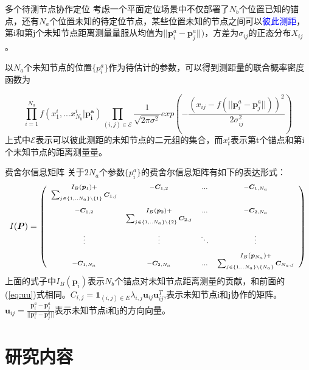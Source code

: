 \documentclass[notheorems,xetex,mathserif,serif]{beamer}
\begin{document}
\begin{frame}{多个待测节点协作定位}
考虑一个平面定位场景中不仅部署了$N_b$个位置已知的锚点，还有$N_a$个位置未知的待定位节点，某些位置未知的节点之间可以\textcolor{blue}{彼此测距}，第i和第j个未知节点距离测量量服从均值为$||\bm{p}^a_i-\bm{p}^a_j||)$，方差为$\sigma_{ij}$的正态分布$X_{ij}$。

以$N_a$个未知节点的位置$\{p_i^a\}$作为待估计的参数，可以得到测距量的联合概率密度函数为

\begin{equation}
\prod_{i=1}^{N_a} f(x^i_1,...x^{i}_{N_b}|\bm{p^a_i})\prod_{(i,j)\in \mathcal{E}}\frac{1}{\sqrt{2\pi\sigma^2}}exp(-\frac{(x_{ij}-f(||\bm{p}^a_i-\bm{p}^a_j||))^2}{2\sigma_{ij}^2})
\end{equation}
上式中$\mathcal{E}$表示可以彼此测距的未知节点的二元组的集合，而$x_t^i$表示第t个锚点和第i个未知节点的距离测量量。
\end{frame}
\begin{frame}{费舍尔信息矩阵}
关于$2N_a$个参数$\{p_i^a\}$的费舍尔信息矩阵有如下的表达形式：
\begin{equation}
\scriptsize{
I(\bm{P})=
\left(
\begin{array}{cccc}
I_B(\bm{p}_1)+&-\bm{C}_{1,2}&...&-\bm{C}_{1,N_a}\\
\sum_{j\in \{1,..N_a\}\backslash\{1\}}\bm{C}_{1,j}&&&\\
&&&\\
-\bm{C}_{1,2} & I_B(\bm{p}_2)+
&...&-\bm{C}_{2,N_a}\\
&\sum_{j\in \{1,..N_a\}\backslash \{2\}}\bm{C}_{2,j}&&\\
&&&\\
\vdots &\vdots&\ddots &\vdots\\
&&&\\
&&&I_B(\bm{p}_{N_a})+\\
-\bm{C}_{1,N_a}&-\bm{C}_{2,N_a}&...& \sum_{j\in \{1,..N_a\}\backslash\{N_a\}}\bm{C}_{N_a,j}\\
\end{array}
\right)
}
\end{equation}
上面的式子中$I_B(\bm{p}_i)$表示$N_b$个锚点对未知节点距离测量的贡献，和前面的(\ref{eq:uu})式相同。$C_{i,j}=\bm{1}_{(i,j)\in E}\lambda_{i,j}\bm{u}_{ij}\bm{u}_{ij}^T$,表示未知节点i和j协作的矩阵。
$\bm{u}_{ij}=\frac{\bm{p}^a_i-\bm{p}^a_j}{||\bm{p}^a_i-\bm{p}^a_j||}$表示未知节点i和j的方向向量。
  \end{frame}


\section{研究内容}
\end{document}
